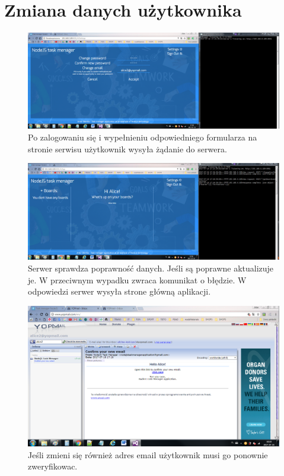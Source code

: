 \documentclass[12pt]{report}
\begin{document}
\section{Zmiana danych użytkownika}
\begin{figure}[!hb]
\centering
\includegraphics[width=\textwidth,height=\textheight,keepaspectratio]{61.png}
\captionsetup{labelformat=empty}
\caption[]{Po zalogowaniu się i wypełnieniu odpowiedniego formularza na stronie serwisu użytkownik wysyła żądanie do serwera.}
\end{figure}
\begin{figure}[!hb]
\centering
\includegraphics[width=\textwidth,height=\textheight,keepaspectratio]{62.png}
\captionsetup{labelformat=empty}
\caption[]{Serwer sprawdza poprawność danych. Jeśli są poprawne aktualizuje je.
W przeciwnym wypadku zwraca komunikat o błędzie. 
W odpowiedzi serwer wysyła strone główną aplikacji.}
\end{figure}
\begin{figure}[!hb]
\centering
\includegraphics[width=\textwidth,height=\textheight,keepaspectratio]{63.png}
\captionsetup{labelformat=empty}
\caption[]{Jeśli zmieni się również adres email użytkownik musi go ponownie zweryfikowac. }
\end{figure}
\end{document}
